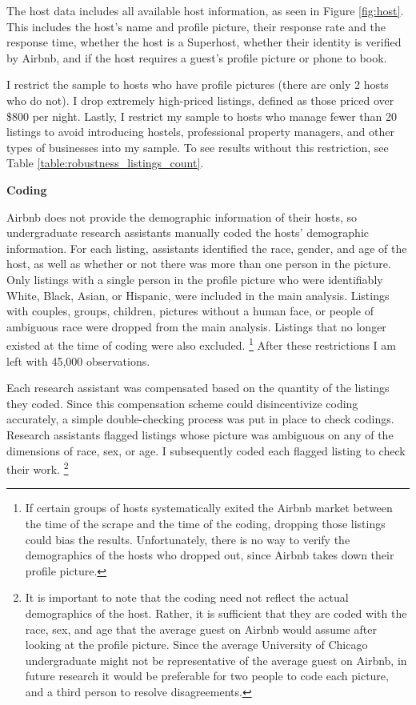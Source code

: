 The host data includes all available host information, as seen in Figure \ref{fig:host}. This includes the host's name and profile picture, their response rate and the response time, whether the host is a Superhost, whether their identity is verified by Airbnb, and if the host requires a guest's profile picture or phone to book. 

I restrict the sample to hosts who have profile pictures (there are only 2 hosts who do not). I drop extremely high-priced listings, defined as those priced over \$800 per night. Lastly, I restrict my sample to hosts who manage fewer than 20 listings to avoid introducing hostels, professional property managers, and other types of businesses into my sample. To see results without this restriction, see Table \ref{table:robustness_listings_count}. 


\textbf{Coding} 

Airbnb does not provide the demographic information of their hosts, so undergraduate research assistants manually coded the hosts' demographic information. For each listing, assistants identified the race, gender, and age of the host, as well as whether or not there was more than one person in the picture. Only listings with a single person in the profile picture who were identifiably White, Black, Asian, or Hispanic, were included in the main analysis. Listings with couples, groups, children, pictures without a human face, or people of ambiguous race were dropped from the main analysis. Listings that no longer existed at the time of coding were also excluded.%
	\footnote{If certain groups of hosts systematically exited the Airbnb market between the time of the scrape and the time of the coding, dropping those listings could bias the results. Unfortunately, there is no way to verify the demographics of the hosts who dropped out, since Airbnb takes down their profile picture.}
After these restrictions I am left with 45,000 observations.

Each research assistant was compensated based on the quantity of the listings they coded. Since this compensation scheme could disincentivize coding accurately, a simple double-checking process was put in place to check codings. Research assistants flagged listings whose picture was ambiguous on any of the dimensions of race, sex, or age. I subsequently coded each flagged listing to check their work.%
	\footnote{It is important to note that the coding need not reflect the actual demographics of the host. Rather, it is sufficient that they are coded with the race, sex, and age that the average guest on Airbnb would assume after looking at the profile picture. Since the average University of Chicago undergraduate might not be representative of the average guest on Airbnb, in future research it would be preferable for two people to code each picture, and a third person to resolve disagreements.}


